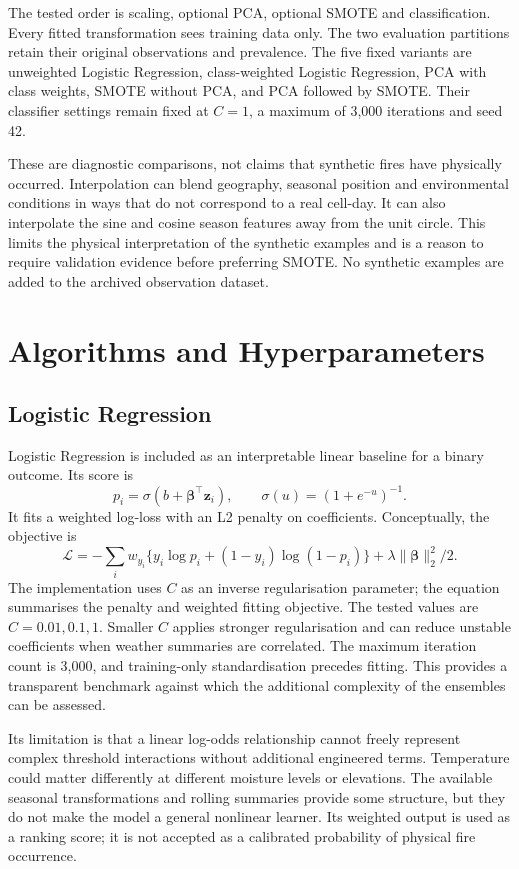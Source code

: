 \documentclass[conference,a4paper]{IEEEtran}
\begin{document}
The tested order is scaling, optional PCA, optional SMOTE and classification. Every fitted transformation sees training data only. The two evaluation partitions retain their original observations and prevalence. The five fixed variants are unweighted Logistic Regression, class-weighted Logistic Regression, PCA with class weights, SMOTE without PCA, and PCA followed by SMOTE. Their classifier settings remain fixed at $C=1$, a maximum of 3,000 iterations and seed 42.

These are diagnostic comparisons, not claims that synthetic fires have physically occurred. Interpolation can blend geography, seasonal position and environmental conditions in ways that do not correspond to a real cell-day. It can also interpolate the sine and cosine season features away from the unit circle. This limits the physical interpretation of the synthetic examples and is a reason to require validation evidence before preferring SMOTE. No synthetic examples are added to the archived observation dataset.
\section{Algorithms and Hyperparameters}
\subsection{Logistic Regression}
Logistic Regression is included as an interpretable linear baseline for a binary outcome. Its score is
\begin{equation}
p_i=\sigma(b+\boldsymbol\beta^{\top}\mathbf z_i),\qquad
\sigma(u)=(1+e^{-u})^{-1}.
\end{equation}
It fits a weighted log-loss with an L2 penalty on coefficients. Conceptually, the objective is
\begin{equation}
\mathcal L=-\sum_i w_{y_i}\{y_i\log p_i+(1-y_i)\log(1-p_i)\}
+\lambda\|\boldsymbol\beta\|_2^2/2.
\end{equation}
The implementation uses $C$ as an inverse regularisation parameter; the equation summarises the penalty and weighted fitting objective. The tested values are $C=0.01,0.1,1$. Smaller $C$ applies stronger regularisation and can reduce unstable coefficients when weather summaries are correlated. The maximum iteration count is 3,000, and training-only standardisation precedes fitting. This provides a transparent benchmark against which the additional complexity of the ensembles can be assessed.

Its limitation is that a linear log-odds relationship cannot freely represent complex threshold interactions without additional engineered terms. Temperature could matter differently at different moisture levels or elevations. The available seasonal transformations and rolling summaries provide some structure, but they do not make the model a general nonlinear learner. Its weighted output is used as a ranking score; it is not accepted as a calibrated probability of physical fire occurrence.
\end{document}
